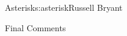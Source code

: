 \begin{aosachapter}{Asterisk}{s:asterisk}{Russell Bryant}
\begin{aosasect1}{Final Comments}
\end{aosasect1}

\end{aosachapter}

